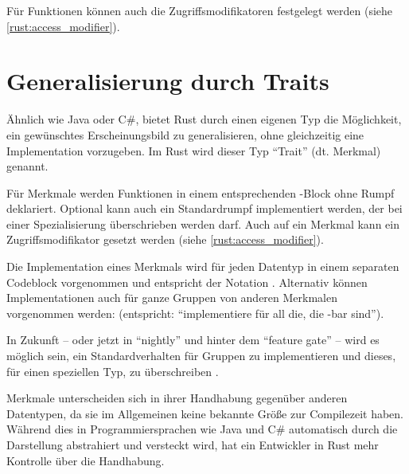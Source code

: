 Für Funktionen können auch die Zugriffsmodifikatoren festgelegt werden (siehe \autoref{rust:access_modifier}).

\section{Generalisierung durch Traits}
\label{rust:traits}
\label{rust:generics}
\label{rust:trait:default}
\label{rust:trait:drop}
\label{rust:trait:send}

Ähnlich wie Java oder C\#, bietet Rust durch einen eigenen Typ die Möglichkeit, ein gewünschtes Erscheinungsbild zu generalisieren, ohne gleichzeitig eine Implementation vorzugeben.
Im Rust wird dieser Typ \enquote{Trait} (dt. Merkmal) genannt.

Für Merkmale werden Funktionen in einem entsprechenden -Block ohne Rumpf deklariert.
Optional kann auch ein Standardrumpf implementiert werden, der bei einer Spezialisierung überschrieben werden darf.
Auch auf ein Merkmal kann ein Zugriffsmodifikator gesetzt werden (siehe \autoref{rust:access_modifier}).

Die Implementation eines Merkmals wird für jeden Datentyp in einem separaten Codeblock vorgenommen und entspricht der Notation .
Alternativ können Implementationen auch für ganze Gruppen von anderen Merkmalen vorgenommen werden:  (entspricht: \enquote{implementiere  für all die, die -bar sind}).

In Zukunft -- oder jetzt in \enquote{nightly} und hinter dem \enquote{feature gate}  -- wird es möglich sein, ein Standardverhalten für Gruppen zu implementieren und dieses, für einen speziellen Typ, zu überschreiben \cite{rust:github:specialization}.

Merkmale unterscheiden sich in ihrer Handhabung gegenüber anderen Datentypen, da sie im Allgemeinen keine bekannte Größe zur Compilezeit haben.
Während dies in Programmiersprachen wie Java und C\# automatisch durch die Darstellung abstrahiert und versteckt wird, hat ein Entwickler in Rust mehr Kontrolle über die Handhabung.

